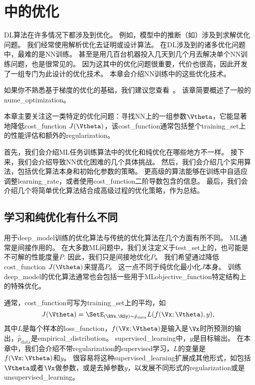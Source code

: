 \chapter{中的优化}
\label{chap:optimization_for_training_deep_models}
\gls{DL}算法在许多情况下都涉及到优化。
例如，模型中的推断（如）涉及到求解优化问题。
我们经常使用解析优化去证明或设计算法。
在\gls{DL}涉及到的诸多优化问题中，最难的是\gls{NN}训练。
甚至是用几百台机器投入几天到几个月去解决单个\gls{NN}训练问题，也是很常见的。
因为这其中的优化问题很重要，代价也很高，因此开发了一组专门为此设计的优化技术。
本章会介绍\gls{NN}训练中的这些优化技术。

如果你不熟悉基于梯度的优化的基础，我们建议您查看~。
该章简要概述了一般的\gls{nume_optimization}。


本章主要关注这一类特定的优化问题：寻找\gls{NN}上的一组参数$\Vtheta$，它能显著地降低\gls{cost_function} $J(\Vtheta)$，该\gls{cost_function}通常包括整个\gls{training_set}上的性能评估和额外的\gls{regularization}。


首先，我们会介绍\gls{ML}任务训练算法中的优化和纯优化在哪些地方不一样。
接下来，我们会介绍导致\gls{NN}优化困难的几个具体挑战。
然后，我们会介绍几个实用算法，包括优化算法本身和初始化参数的策略。
更高级的算法能够在训练中自适应调整\gls{learning_rate}，或者使用\gls{cost_function}二阶导数包含的信息。
最后，我们会介绍几个将简单优化算法结合成高级过程的优化策略，作为总结。


\section{学习和纯优化有什么不同}
\label{sec:how_learning_differs_from_pure_optimization}
用于\gls{deep_model}训练的优化算法与传统的优化算法在几个方面有所不同。
\gls{ML}通常是间接作用的。
在大多数\gls{ML}问题中，我们关注定义于\gls{test_set}上的，也可能是不可解的性能度量$P$.
因此，我们只是间接地优化$P$。
我们希望通过降低\gls{cost_function} $J(\Vtheta)$来提高$P$。
这一点不同于纯优化最小化$J$本身。
训练\gls{deep_model}的优化算法通常也会包括一些用于\gls{ML}\gls{objective_function}特定结构上的特殊优化。


通常，\gls{cost_function}可写为\gls{training_set}上的平均，如
\begin{equation}
\label{eq:8.1}
    J(\Vtheta) = \SetE_{(\RVx, \RSy) \sim\hat{p}_\text{data}} L(f(\Vx ; \Vtheta), y),
\end{equation}
其中$L$是每个样本的\gls{loss_function}，$f(\Vx;\Vtheta)$是输入是$\Vx$时所预测的输出，$\hat{p}_{\text{data}}$是\gls{empirical_distribution}。
\gls{supervised_learning}中，$y$是目标输出。
在本章中，我们会介绍不带\gls{regularization}的\gls{supervised}学习，$L$的变量是$f(\Vx;\Vtheta)$和$y$。
很容易将这种\gls{supervised_learning}扩展成其他形式，如包括$\Vtheta$或者$\Vx$做参数，或是去掉参数$y$，以发展不同形式的\gls{regularization}或是\gls{unsupervised_learning}。


